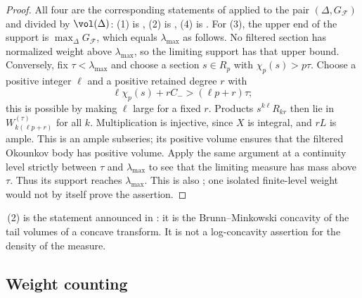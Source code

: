 \begin{proof}
All four are the corresponding statements of  applied
to the pair $(\Delta,G_{\mathcal F})$ and divided by
$\vol(\Delta)$: (1) is , (2) is
, (4) is .  For (3), the
upper end of the support is
$\max_\Delta G_{\mathcal F}$, which equals $\lambda_{\max}$ as follows.  No filtered section has
normalized weight above $\lambda_{\max}$, so the limiting support has
that upper bound.  Conversely, fix $\tau<\lambda_{\max}$ and choose
a section $s\in R_p$ with $\chi_p(s)>p\tau$.  Choose a positive
integer $\ell$ and a positive retained degree $r$ with
\[
 \ell\chi_p(s)+rC_->(\ell p+r)\tau ;
\]
this is possible by making $\ell$ large for a fixed $r$.  Products
$s^{k\ell}R_{kr}$ then lie in $W^{(\tau)}_{k(\ell p+r)}$ for all $k$.
Multiplication is injective, since $X$ is integral, and $rL$ is ample.
This is an ample subseries; its positive volume ensures that the
filtered Okounkov body has positive volume.  Apply the same argument
at a continuity level strictly between $\tau$ and $\lambda_{\max}$
to see that the limiting measure has mass above $\tau$.
Thus its support reaches $\lambda_{\max}$.  This is also
\cite[Lemma~1.6]{BC11}; one isolated finite-level weight would not by
itself prove the assertion.
\end{proof}

\,(2) is the statement announced in
: it is the Brunn--Minkowski concavity of the
tail volumes of a concave transform.  It is not a log-concavity assertion
for the density of the measure.

\subsection{Weight counting}
\label{sec:ch33-dh-weights}


